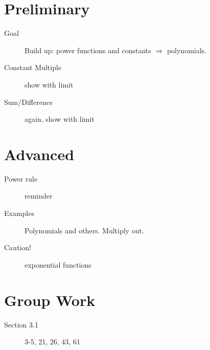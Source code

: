 \documentclass[11pt]{article}
\begin{document}
\drawtitle

\section*{Preliminary}
\begin{description}
\item[Goal] Build up: power functions and constants $\Rightarrow$
  polynomials.
\item[Constant Multiple] show with limit
\item[Sum/Difference] again, show with limit
\end{description}

\section*{Advanced}
\begin{description}
\item[Power rule] reminder
\item[Examples] Polynomials and others.  Multiply out.
\item[Caution!] exponential functions
\end{description}

\section*{Group Work}
\begin{description}
\item[Section 3.1] 3-5, 21, 26, 43, 61
\end{description}
\end{document}
